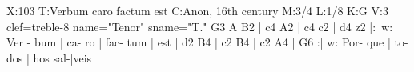 X:103
T:Verbum caro factum est
C:Anon, 16th century
M:3/4
L:1/8
K:G
V:3 clef=treble-8 name="Tenor" sname="T."
G3 A B2 | c4 A2 | c4 c2 | d4 z2 |:\
w: Ver - bum | ca- ro | fac- tum | est |
d2 B4 | c2 B4 | c2 A4 | G6 :|
w: Por- que | to- dos  | hos sal-|veis

